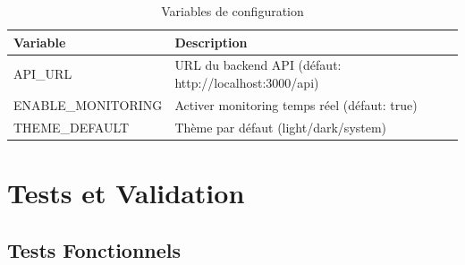 \documentclass[12pt,a4paper]{article}
\begin{document}
\begin{table}[H]
\centering
\begin{tabular}{>{\ttfamily}l p{8cm}}
\toprule
\normalfont\textbf{Variable} & \textbf{Description} \\
\midrule
API\_URL & URL du backend API (défaut: http://localhost:3000/api) \\
ENABLE\_MONITORING & Activer monitoring temps réel (défaut: true) \\
THEME\_DEFAULT & Thème par défaut (light/dark/system) \\
\bottomrule
\end{tabular}
\caption{Variables de configuration}
\end{table}

\section{Tests et Validation}

\subsection{Tests Fonctionnels}
\end{document}
